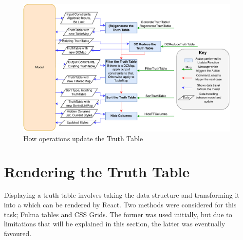 \begin{figure}[h]
    \centering
    \includegraphics[width=\textwidth]{05.ImpPlan/tableoperations.pdf}
    \caption{How operations update the Truth Table}
    \label{fig:ttOps}
\end{figure}

\section{Rendering the Truth Table}
Displaying a truth table involves taking the  data structure and transforming it into a  which can be rendered by React. Two methods were considered for this task; Fulma tables and CSS Grids. The former was used initially, but due to limitations that will be explained in this section, the latter was eventually favoured.

